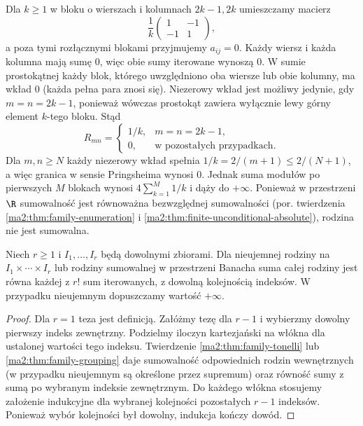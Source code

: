\begin{przyklad}
\label{ma2:ex:double-blocks}
Dla $k\ge1$ w bloku o wierszach i kolumnach
$2k-1,2k$ umieszczamy macierz
\[
 \frac1k\begin{pmatrix}1&-1\\-1&1\end{pmatrix},
\]
a poza tymi rozłącznymi blokami przyjmujemy $a_{ij}=0$.
Każdy wiersz i każda kolumna mają sumę $0$, więc obie
sumy iterowane wynoszą $0$.
W sumie prostokątnej każdy blok, którego uwzględniono
oba wiersze lub obie kolumny, ma wkład $0$
(każda pełna para znosi się). Niezerowy wkład jest
możliwy jedynie, gdy $m=n=2k-1$, ponieważ wówczas
prostokąt zawiera wyłącznie lewy górny element
$k$-tego bloku. Stąd
\[
 R_{mn}=
 \begin{cases}
  1/k,&m=n=2k-1,\\
  0,&\text{w pozostałych przypadkach}.
 \end{cases}
\]
Dla $m,n\ge N$ każdy niezerowy wkład spełnia
$1/k=2/(m+1)\le2/(N+1)$, a więc granica
w sensie Pringsheima wynosi $0$.
Jednak suma modułów po pierwszych $M$ blokach
wynosi $4\sum_{k=1}^M1/k$ i dąży do $+\infty$.
Ponieważ w przestrzeni $\R$ sumowalność jest
równoważna bezwzględnej sumowalności
(por. twierdzenia \ref{ma2:thm:family-enumeration}
i \ref{ma2:thm:finite-unconditional-absolute}),
rodzina nie jest sumowalna.
\end{przyklad}

\begin{wniosek}
\label{ma2:cor:multiple-family}
Niech $r\ge1$ i $I_1,\ldots,I_r$ będą dowolnymi
zbiorami. Dla nieujemnej rodziny na $I_1\times\cdots\times I_r$
lub rodziny sumowalnej w przestrzeni Banacha
suma całej rodziny jest równa każdej z $r!$
sum iterowanych, z dowolną kolejnością indeksów.
W przypadku nieujemnym dopuszczamy wartość $+\infty$.
\end{wniosek}
\begin{proof}
Dla $r=1$ teza jest definicją. Załóżmy tezę dla $r-1$
i wybierzmy dowolny pierwszy indeks zewnętrzny.
Podzielmy iloczyn kartezjański na włókna dla
ustalonej wartości tego indeksu. Twierdzenie
\ref{ma2:thm:family-tonelli} lub
\ref{ma2:thm:family-grouping} daje sumowalność
odpowiednich rodzin wewnętrznych (w przypadku
nieujemnym są określone przez supremum) oraz
równość sumy z sumą po wybranym indeksie zewnętrznym.
Do każdego włókna stosujemy założenie indukcyjne
dla wybranej kolejności pozostałych $r-1$ indeksów.
Ponieważ wybór kolejności był dowolny, indukcja
kończy dowód.
\end{proof}

